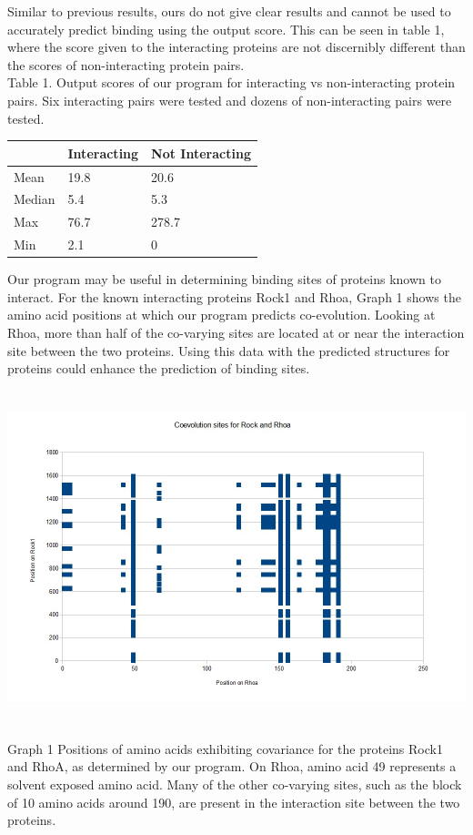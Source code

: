 \documentclass[11pt]{article}
\begin{document}
Similar to previous results, ours do not give clear results and cannot be used to accurately predict binding using the output score.  This can be seen in table 1, where the score given to the interacting proteins are not discernibly different than the scores of non-interacting protein pairs.  \\

Table 1. Output scores of our program for interacting vs non-interacting protein pairs.  Six interacting pairs were tested and dozens of non-interacting pairs were tested.\\


\begin{center}
\begin{tabular}{ | l | l | p{5cm} |}
\hline
 & Interacting & Not Interacting \\ \hline
Mean & 19.8 & 20.6 \\ \hline
Median & 5.4   & 5.3  
 \\ \hline
Max & 76.7 & 278.7
 \\ \hline
Min & 2.1 & 0
 \\
\hline
\end{tabular}
\end{center}

Our program may be useful in determining binding sites of proteins known to interact.  For the known interacting proteins Rock1 and Rhoa, Graph 1 shows the amino acid positions at which our program predicts co-evolution.  Looking at Rhoa, more than half of the co-varying sites are located at or near the interaction site between the two proteins.  Using this data with the predicted structures for proteins could enhance the prediction of binding sites.\\

\includegraphics[width=6.5in,height=4.1in]{pos.png}
Graph 1 Positions of amino acids exhibiting covariance for the proteins Rock1 and RhoA, as determined by our program.  On Rhoa, amino acid 49 represents a solvent exposed amino acid.  Many of the other co-varying sites, such as the block of 10 amino acids around 190, are present in the interaction site between the two proteins.\\
\end{document}
